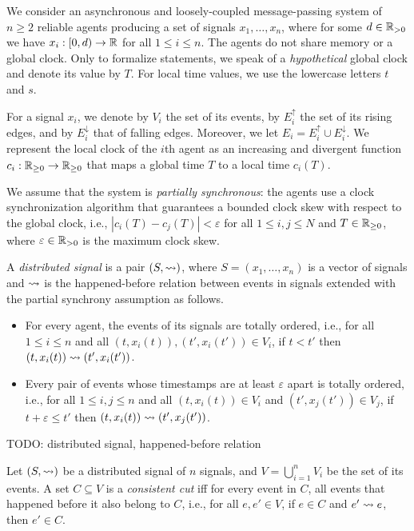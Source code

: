 We consider an asynchronous and loosely-coupled message-passing system of $n \geq 2$ reliable agents producing a set of signals $x_1, \ldots, x_n$, where for some $d \in \mathbb{R}_{> 0}$ we have $x_i : [0,d) \to \mathbb{R}$ for all $1 \leq i \leq n$.
%
The agents do not share memory or a global clock.
%
Only to formalize statements, we speak of a \emph{hypothetical} global clock and denote its value by $T$.
%
For local time values, we use the lowercase letters $t$ and $s$.

For a signal $x_i$, we denote by $V_i$ the set of its events, by $E_i^\uparrow$ the set of its rising edges, and by $E_i^\downarrow$ that of falling edges.
Moreover, we let $E_i = E_i^\uparrow \cup E_i^\downarrow$.
%
We represent the local clock of the $i$th agent as an increasing and divergent function $c_i : 
\mathbb{R}_{\geq 0} \to \mathbb{R}_{\geq 0}$ that maps a global time $T$ to a local time $c_i(T)$.

We assume that the system is \emph{partially synchronous}: the agents use a clock synchronization algorithm that guarantees a bounded clock skew with respect to the global clock, i.e., $|c_i(T) - c_j(T)| < \varepsilon$ for all $1 \leq i,j \leq N$ and $T \in \mathbb{R}_{\geq 0}$, where $\varepsilon \in \mathbb{R}_{> 0}$ is the maximum clock skew.

\begin{definition} \label{defn:hb}
	A \emph{distributed signal} is a pair $(S, {\rightsquigarrow})$, where $S = (x_1, \ldots, x_n)$ is a vector of 
	signals and ${\rightsquigarrow}$ is the happened-before relation between events in signals extended with the 
	partial synchrony assumption as follows.
	\begin{itemize}
		\item For every agent, the events of its signals are totally ordered, i.e., for all $1 \leq i \leq n$ and all $(t, x_i(t)), (t', x_i(t')) \in V_i$, if $t < t'$ then $(t, x_i(t)) \rightsquigarrow (t', x_i(t'))$.
		\item Every pair of events whose timestamps are at least $\varepsilon$ apart is totally ordered, i.e., for all $1 \leq i,j \leq n$ and all $(t, x_i(t)) \in V_i$ and $(t', x_j(t')) \in V_j$, if $t + \varepsilon \leq t'$ then $(t, x_i(t)) \rightsquigarrow (t', x_j(t'))$.
	\end{itemize}
\end{definition}

\begin{example}
	\alert{TODO: distributed signal, happened-before relation}
\end{example}

\begin{definition}
	Let $(S, {\rightsquigarrow})$ be a distributed signal of $n$ signals, and $V = \bigcup_{i = 1}^{n} V_i$ be the set of its events.
	A set $C \subseteq V$ is a \emph{consistent cut} iff for every event in $C$, all events that happened before  it also belong to $C$, i.e., for all $e, e' \in V$, if $e \in C$ and $e' \rightsquigarrow e$, then $e' \in C$.
\end{definition}

